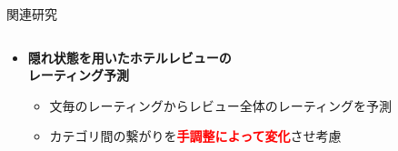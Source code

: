 \documentclass[unicode,10pt]{beamer}
\newcommand{\itemtitle}[1]{\textbf{#1}\\}
\newcommand{\fire}[1]{\textcolor{red}{\textbf{#1}}}
\begin{document}
\begin{frame}[t]
\begin{block}{関連研究}
  \begin{columns}[onlytextwidth,t]
    \begin{column}{0.3\textwidth}
      \begin{itemize}
        \item \itemtitle{隠れ状態を用いたホテルレビューの\\レーティング予測
                         \cite{fujitani15}}
          \begin{itemize}
            \item 文毎のレーティングからレビュー全体のレーティングを予測
            \item カテゴリ間の繋がりを\fire{手調整によって変化}させ考慮
          \end{itemize}
      \end{itemize}
    \end{column}


\end{columns}
\end{block}
\end{frame}
\end{document}
